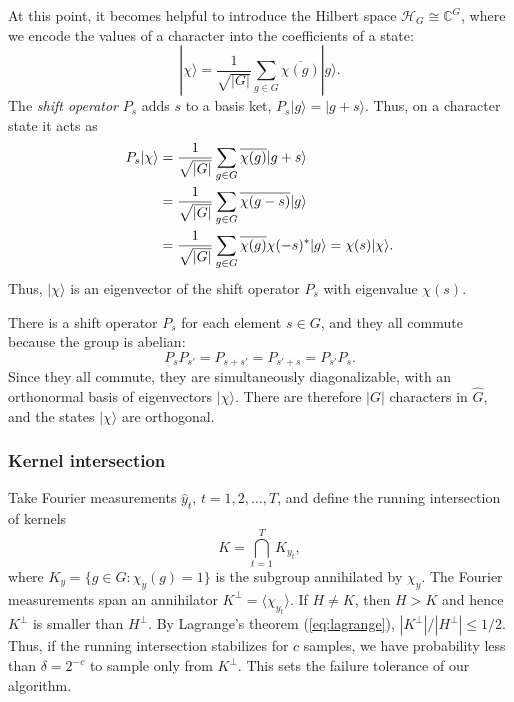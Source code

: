 \documentclass[aps, pre,reprint,nofootinbib,citeautoscript,floatfix]{revtex4-1}
\begin{document}
At this point, it becomes helpful to introduce the Hilbert space
$\mathcal{H}_G \cong \mathbb{C}^{G}$, where we encode the values of a
character into the coefficients of a state:
\begin{equation}
  \label{eq:85}
  |\chi\rangle = \frac{1}{\sqrt{|G|}}\sum_{g\in G} \overline{\chi(g)}|g\rangle.
\end{equation}
The \emph{shift operator} $P_s$ adds $s$ to a basis ket, $P_s|g\rangle
= |g+s\rangle$. Thus, on a character state it acts as
\begin{align}
  \label{eq:83}
  P_s |\chi\rangle & = \frac{1}{\sqrt{|G|}}\sum_{g\in G}
                     \overline{\chi(g)}|g +s\rangle \notag \\
  & = \frac{1}{\sqrt{|G|}}\sum_{g\in G}
    \overline{\chi(g-s)}|g\rangle \notag \\
    & = \frac{1}{\sqrt{|G|}}\sum_{g\in G}
                     \overline{\chi(g)} \chi(-s)^*|g\rangle = \chi(s)|\chi\rangle.
\end{align}
Thus, $|\chi\rangle$ is an eigenvector of the shift operator $P_s$
with eigenvalue $\chi(s)$.

There is a shift operator $P_s$ for each element $s\in G$, and
they all commute because the group is abelian:
\begin{equation}
  \label{eq:86}
  P_s P_{s'} = P_{s+s'} = P_{s'+s} = P_{s'}P_s.
\end{equation}
Since they all commute, they are simultaneously diagonalizable, with
an orthonormal basis of eigenvectors $|\chi\rangle$.
There are therefore $|G|$ characters in $\hat{G}$, and the states
$|\chi\rangle$ are orthogonal.

\subsubsection*{Kernel intersection}
\label{sec:kernel-intersection}

Take Fourier measurements $\hat{y}_t$, $t = 1, 2,
\ldots, T$, and define the running intersection of kernels
\begin{equation}
K = \bigcap_{t=1}^T K_{y_t}, \label{run-int}    
\end{equation}
where $K_y = \{g \in G: \chi_y(g) = 1\}$ is the subgroup annihilated
by $\chi_y$.
The Fourier measurements span an annihilator $K^\perp = \langle
\chi_{y_t}\rangle$.
If $H \neq K$, then $H > K$ and hence $K^\perp$ is smaller than $H^\perp$.
By Lagrange's theorem (\ref{eq:lagrange}), $|K^\perp|/|H^\perp| \leq
1/2$.
Thus, if the running intersection stabilizes for $c$ samples, we have
probability less than $\delta = 2^{-c}$ to sample only from $K^\perp$.
This sets the failure tolerance of our algorithm.
\end{document}
